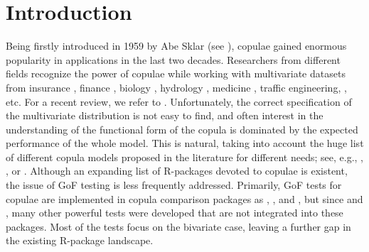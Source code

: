 \section[Introduction]{Introduction}\label{sec:Intro}
Being firstly introduced in 1959 by Abe Sklar (see \citet{sklar_1959}), copulae gained enormous popularity in applications in the last two decades. Researchers from different fields recognize the power of copulae while working with multivariate datasets from insurance \citep{insurance_paper_1, insurance_paper_2}, finance \citep{finance_paper_1, finance_paper_2}, biology \citep{biology_paper_1, biology_paper_2}, hydrology \citep{hydrology_paper_1, hydrology_paper_2}, medicine \citep{medicine_paper_1, medicine_paper_2}, traffic engineering, \citep{traffic_paper_1, traffic_paper_2}, etc. \mycolor For a recent review, we refer to \cite{grosser2021copulae}. \bk Unfortunately, the correct specification of the multivariate distribution is not easy to find, and often interest in the understanding of the functional form of the copula is dominated by the expected performance of the whole model. This is natural, taking into account the huge list of different copula models proposed in the literature for different needs; see, e.g., \citet{durante2010copula}, \citet{joe2011dependence}, or \citet{genest2014copulas}. Although an expanding list of R-packages devoted to copulae is existent, the issue of GoF testing is less frequently addressed. Primarily, GoF tests for copulae are implemented in copula comparison packages as  \citep{yan2007enjoy},  \citep{TwoCop}, and  \citep{schepsmeier2018package}, but since \citet{remillard_scaillet_2009} and \citet{genest_remillard_beaudoin_2009}, many other powerful tests were developed that are not integrated into these packages. Most of the tests focus on the bivariate case, leaving a further gap in the existing R-package landscape.

